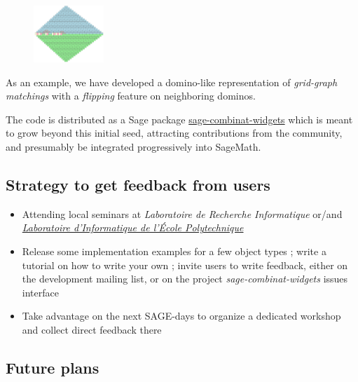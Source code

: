 \documentclass{deliverablereport}
\begin{document}
\begin{figure}
    \begin{center}
      \includegraphics[width=100px]{images/dominos-azteque}
\end{center}
\end{figure}

As an example, we have developed a domino-like representation of
\emph{grid-graph matchings} with a \emph{flipping} feature on neighboring dominos.

The code is distributed as a Sage package
\href{https://github.com/sagemath/sage-combinat-widgets/}{sage-combinat-widgets}
which is meant to grow beyond this initial seed, attracting
contributions from the community, and presumably be integrated
progressively into SageMath.

\subsection{Strategy to get feedback from users}

\begin{itemize}
  \item Attending local seminars at \emph{Laboratoire de Recherche Informatique} or/and \emph{\href{https://www.lix.polytechnique.fr/}{Laboratoire d'Informatique de l'École Polytechnique}}
  \item Release some implementation examples for a few object types ; write a tutorial on how to write your own ; invite users to write feedback, either on the development mailing list, or on the  project \emph{sage-combinat-widgets} issues interface
  \item Take advantage on the next SAGE-days to organize a dedicated workshop and collect direct feedback there
\end{itemize}

\subsection{Future plans}
\end{document}
